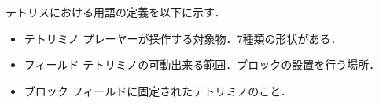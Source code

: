 テトリスにおける用語の定義を以下に示す．

\begin{itemize}
  \item テトリミノ プレーヤーが操作する対象物．7種類の形状がある．
  \item フィールド テトリミノの可動出来る範囲．ブロックの設置を行う場所．
  \item ブロック フィールドに固定されたテトリミノのこと．
\end{itemize}

